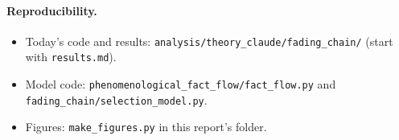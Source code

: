 \documentclass[10pt,a4paper]{article}
\begin{document}
\paragraph{Reproducibility.}
\begin{itemize}
\item Today's code and results: \nolinkurl{analysis/theory_claude/fading_chain/} (start with \nolinkurl{results.md}).
\item Model code: \nolinkurl{phenomenological_fact_flow/fact_flow.py} and \nolinkurl{fading_chain/selection_model.py}.
\item Figures: \nolinkurl{make_figures.py} in this report's folder.
\end{itemize}
\end{document}

